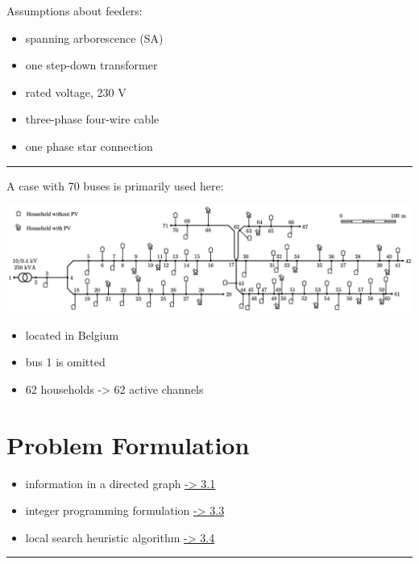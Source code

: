 \documentclass[
]{book}
\providecommand{\tightlist}{%
  \setlength{\itemsep}{0pt}\setlength{\parskip}{0pt}}
\begin{document}
Assumptions about feeders:

\begin{itemize}
\tightlist
\item
  spanning arborescence (SA)
\item
  one step-down transformer
\item
  rated voltage, 230 V
\item
  three-phase four-wire cable
\item
  one phase star connection
\end{itemize}

\begin{center}\rule{0.5\linewidth}{0.5pt}\end{center}

A case with 70 buses is primarily used here:

\includegraphics{Pictures/case70true.png}

\begin{itemize}
\tightlist
\item
  located in Belgium
\item
  bus 1 is omitted
\item
  62 households -\textgreater{} 62 active channels
\end{itemize}

\hypertarget{problem-formulation}{%
\chapter{Problem Formulation}\label{problem-formulation}}

\begin{itemize}
\tightlist
\item
  information in a directed graph \href{directed}{-\textgreater{} 3.1}
\item
  integer programming formulation \protect\hyperlink{IP}{-\textgreater{} 3.3}
\item
  local search heuristic algorithm \protect\hyperlink{combinatorial}{-\textgreater{} 3.4}
\end{itemize}

\begin{center}\rule{0.5\linewidth}{0.5pt}\end{center}
\end{document}
